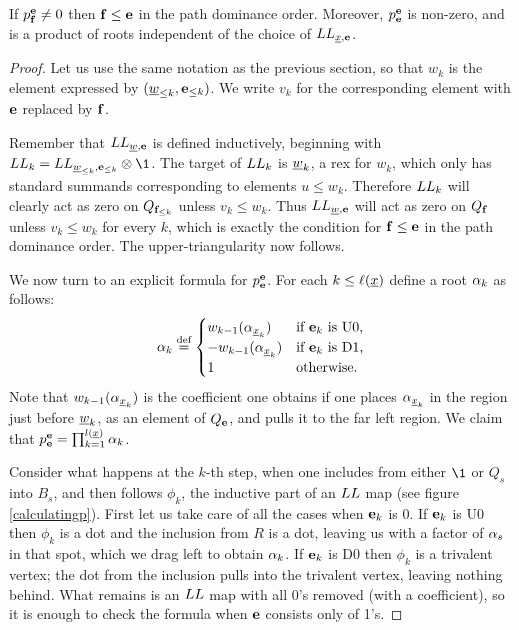\begin{prop} If $p^{\mathbf e}_{\mathbf f} \ne 0$ then ${\mathbf f} \le {\mathbf e}$ in the path dominance order. Moreover, $p^{\mathbf e}_{\mathbf e}$ is non-zero, and is a product of roots
independent of the choice of $LL_{{\underline{x}},{\mathbf e}}$. \end{prop}

\begin{proof} Let us use the same notation as the previous section, so that $w_k$ is the element expressed by $({\underline{w}}_{\le k},{\mathbf e}_{\le k})$. We write $v_k$ for the corresponding element with ${\mathbf e}$ replaced by ${\mathbf f}$.

Remember that $LL_{{\underline{w}},{\mathbf e}}$ is defined inductively, beginning with $\LL_k = \LL_{{\un{w}}_{\le k},\eb_{\le k}} \ot \1$. The target of $LL_k$ is ${\underline{w}}_k$, a rex for $w_k$, which only has
standard summands corresponding to elements $u \le w_k$. Therefore $LL_k$ will clearly act as zero on $Q_{{\mathbf f}_{\le k}}$ unless $v_k \le w_k$. Thus $LL_{{\underline{w}},{\mathbf e}}$ will act as zero on
$Q_{\mathbf f}$ unless $v_k \le w_k$ for every $k$, which is exactly the condition for ${\mathbf f} \le {\mathbf e}$ in the path dominance order. The upper-triangularity now follows.

We now turn to an explicit formula for $p^{\mathbf e}_{\mathbf e}$. For each $k \le \ell({\underline{x}})$ define a root $\alpha_k$ as follows:
\begin{gather*}
  \alpha_k \stackrel{\mbox{\scriptsize{def}}}{=} \begin{cases} w_{k-1}(\alpha_{{\underline{x}}_k}) & \text{if ${\mathbf e}_k$ is U0,} \\
-w_{k-1}(\alpha_{{\underline{x}}_k}) & \text{if ${\mathbf e}_k$ is D1,} \\
1 & \text{otherwise.}
\end{cases}
\end{gather*}
Note that $w_{k-1}(\alpha_{{\underline{x}}_k})$ is the coefficient one obtains if one places $\alpha_{{\underline{x}}_k}$ in the region just before ${\underline{w}}_k$, as an element of $Q_{\mathbf e}$,
and pulls it to the far left region. We claim that $p^{\mathbf e}_{\mathbf e} = \prod_{k=1}^{l({\underline{x}})} \alpha_k$.

Consider what happens at the $k$-th step, when one includes from either $\1$ or $Q_s$ into $B_s$, and then follows $\phi_k$, the inductive part of an $LL$ map (see figure
\ref{calculatingp}). First let us take care of all the cases when ${\mathbf e}_k$ is 0. If ${\mathbf e}_k$ is U0 then $\phi_k$ is a dot and the inclusion from $R$ is a dot, leaving us with a factor of $\alpha_s$ in that spot,
which we drag left to obtain $\alpha_k$. If ${\mathbf e}_k$ is D0 then $\phi_k$ is a trivalent vertex; the dot from the inclusion pulls into the trivalent vertex, leaving nothing behind. What remains
is an $LL$ map with all 0's removed (with a coefficient), so it is enough to check the formula when ${\mathbf e}$ consists only of 1's.


\end{proof}
